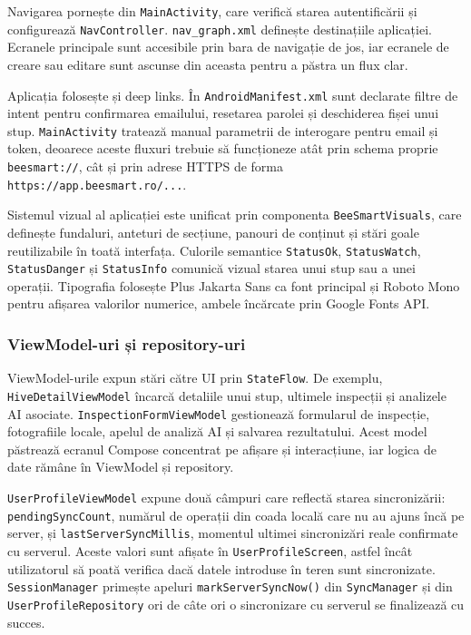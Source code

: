 Navigarea pornește din \texttt{MainActivity}, care verifică starea autentificării și configurează \texttt{NavController}. \texttt{nav\_graph.xml} definește destinațiile aplicației. Ecranele principale sunt accesibile prin bara de navigație de jos, iar ecranele de creare sau editare sunt ascunse din aceasta pentru a păstra un flux clar.

Aplicația folosește și deep links. În \texttt{AndroidManifest.xml} sunt declarate filtre de intent pentru confirmarea emailului, resetarea parolei și deschiderea fișei unui stup. \texttt{MainActivity} tratează manual parametrii de interogare pentru email și token, deoarece aceste fluxuri trebuie să funcționeze atât prin schema proprie \texttt{beesmart://}, cât și prin adrese HTTPS de forma \texttt{https://app.beesmart.ro/...}.

Sistemul vizual al aplicației este unificat prin componenta \texttt{BeeSmartVisuals}, care definește fundaluri, anteturi de secțiune, panouri de conținut și stări goale reutilizabile în toată interfața. Culorile semantice \texttt{StatusOk}, \texttt{StatusWatch}, \texttt{StatusDanger} și \texttt{StatusInfo} comunică vizual starea unui stup sau a unei operații. Tipografia folosește Plus Jakarta Sans ca font principal și Roboto Mono pentru afișarea valorilor numerice, ambele încărcate prin Google Fonts API.

\subsubsection*{ViewModel-uri și repository-uri}

ViewModel-urile expun stări către UI prin \texttt{StateFlow}. De exemplu, \texttt{HiveDetailViewModel} încarcă detaliile unui stup, ultimele inspecții și analizele AI asociate. \texttt{InspectionFormViewModel} gestionează formularul de inspecție, fotografiile locale, apelul de analiză AI și salvarea rezultatului. Acest model păstrează ecranul Compose concentrat pe afișare și interacțiune, iar logica de date rămâne în ViewModel și repository.

\texttt{UserProfileViewModel} expune două câmpuri care reflectă starea sincronizării: \texttt{pendingSyncCount}, numărul de operații din coada locală care nu au ajuns încă pe server, și \texttt{lastServerSyncMillis}, momentul ultimei sincronizări reale confirmate cu serverul. Aceste valori sunt afișate în \texttt{UserProfileScreen}, astfel încât utilizatorul să poată verifica dacă datele introduse în teren sunt sincronizate. \texttt{SessionManager} primește apeluri \texttt{markServerSyncNow()} din \texttt{SyncManager} și din \texttt{UserProfileRepository} ori de câte ori o sincronizare cu serverul se finalizează cu succes.

